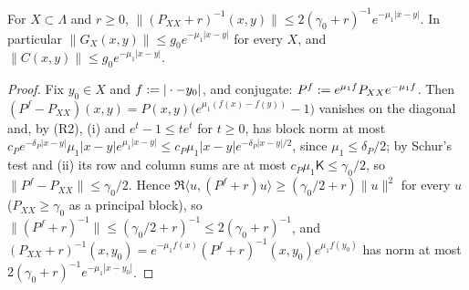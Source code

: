 \begin{lemma}\label{rot:lem:R1ct}
For $X\subset\Lambda$ and $r\ge0$, $\|(P_{XX}+r)^{-1}(x,y)\|\le2(\gamma_0+r)^{-1}e^{-\mu_1|x-y|}$. In particular $\|G_X(x,y)\|\le g_0e^{-\mu_1|x-y|}$ for every $X$, and $\|C(x,y)\|\le g_0e^{-\mu_1|x-y|}$.
\end{lemma}
\begin{proof}
Fix $y_0\in X$ and $f:=|\cdot-y_0|$, and conjugate: $P^f:= e^{\mu_1f}P_{XX}e^{-\mu_1f}$. Then $(P^f-P_{XX})(x,y)=P(x,y)\big(e^{\mu_1(f(x)-f(y))}-1\big)$ vanishes on the diagonal and, by (R2), (i) and $e^t-1\le te^t$ for $t\ge0$, has block norm at most $c_Pe^{-\delta_P|x-y|}\mu_1|x-y|e^{\mu_1|x-y|}\le c_P\mu_1|x-y|e^{-\delta_P|x-y|/2}$, since $\mu_1\le\delta_P/2$; by Schur's test and (ii) its row and column sums are at most $c_P\mu_1\mathsf K\le\gamma_0/2$, so $\|P^f-P_{XX}\|\le\gamma_0/2$. Hence $\Re\langle u,(P^f+r)u\rangle\ge(\gamma_0/2+r)\|u\|^2$ for every $u$ ($P_{XX}\ge\gamma_0$ as a principal block), so $\|(P^f+r)^{-1}\|\le(\gamma_0/2+r)^{-1}\le2(\gamma_0+r)^{-1}$, and $(P_{XX}+r)^{-1}(x,y_0)=e^{-\mu_1f(x)}(P^f+r)^{-1}(x,y_0)e^{\mu_1f(y_0)}$ has norm at most $2(\gamma_0+r)^{-1}e^{-\mu_1|x-y_0|}$.
\end{proof}

